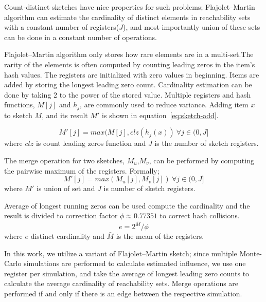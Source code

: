 \documentclass[10pt,journal,compsoc]{IEEEtran}
\begin{document}
Count-distinct sketches have nice properties for such problems; Flajolet–Martin algorithm\cite{flajolet1985probabilistic} can estimate the cardinality of distinct elements in reachability sets with a constant number of registers($J$), and most importantly union of these sets can be done in a constant number of operations.


Flajolet–Martin algorithm only stores how rare elements are in a multi-set.The rarity of the elements is often computed by counting leading zeros in the item's hash values.  The registers are initialized with zero values in beginning. Items are added by storing the longest leading zero count. Cardinality estimation can be done by taking 2 to the power of the stored value. Multiple registers and hash functions, $M[j]$ and $h_j$, are commonly used to reduce variance.
Adding item $x$ to sketch $M$, and its result $M'$ is shown in equation~\ref{eq:sketch-add}.

\begin{equation}
    \label{eq:sketch-add}
    M'[j] = max(M[j],clz(h_j(x)) ~ \forall j\in(0,J]
\end{equation} where $clz$ is count leading zeros function and $J$ is the number of sketch registers.

The merge operation for two sketches, $M_u$,$M_v$, can be performed by computing the pairwise maximum of the registers. Formally; 
\begin{equation}
    \label{eq:sketch-merge}
    M'[j] = max(M_u[j],M_v[j]) ~ \forall j\in(0,J]
\end{equation} 
where $M'$ is union of set and $J$ is number of sketch registers.

Average of longest running zeros can be used compute the cardinality and the result is divided to correction factor $\phi \approx 0.77351$ to correct hash collisions.
\begin{equation}
    \label{eq:sketch-estimate}
    e = 2^{\bar{M}}/\phi
\end{equation} 
where $e$ distinct cardinality and $\bar{M}$ is the mean of the registers.

In this work, we utilize a variant of Flajolet–Martin sketch; since multiple Monte-Carlo simulations are performed to calculate estimated influence, we use one register per simulation, and take the average of longest leading zero counts to calculate the average cardinality of reachability sets. Merge operations are performed if and only if there is an edge between the respective simulation. 
\end{document}
